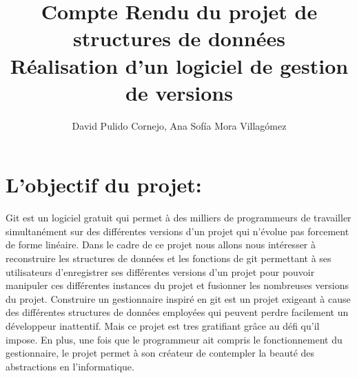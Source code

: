 \documentclass[12pt,francais]{article}
\begin{document}
\title{Compte Rendu du projet de structures de données \\ 
\large Réalisation d'un logiciel de gestion de versions}
\author{David Pulido Cornejo, Ana Sofía Mora Villagómez}
\maketitle
\section{L'objectif du projet:}
Git est un logiciel gratuit qui permet  à des milliers de programmeurs de travailler simultanément sur des différentes versions d’un projet qui n’évolue pas forcement de forme linéaire.  Dans le cadre de ce projet nous allons nous intéresser à reconstruire les structures de données et les fonctions de git permettant à ses utilisateurs d’enregistrer ses différentes versions d’un projet pour pouvoir manipuler ces différentes instances du projet et fusionner les nombreuses versions du projet.
	Construire un gestionnaire inspiré en git est un projet exigeant à cause des différentes structures de données employées qui peuvent perdre facilement un développeur inattentif. Mais ce projet est  tres gratifiant grâce au défi qu’il impose. En plus, une fois que le programmeur ait compris le fonctionnement du gestionnaire, le projet permet à son créateur de contempler la beauté des abstractions en l’informatique.
\end{document}
